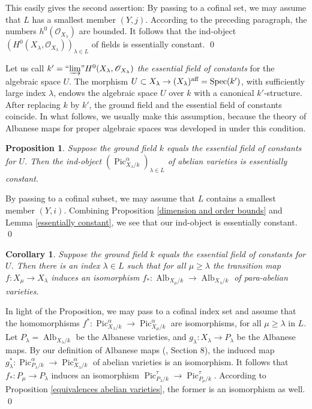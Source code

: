 \documentclass[oneside, 12pt]{amsart}
\newcommand\mylabel[1]{\label{#1}\marginpar{\vspace{-1ex}\medskip\medskip\footnotesize \tt #1}}
\renewcommand\mylabel[1]{\label{#1}}
\newtheorem{proposition}[theorem]{Proposition}
\newtheorem{corollary}[theorem]{Corollary}
\theoremstyle{definition}
\theoremstyle{remark}
\newcommand{\aff}{\text{\rm aff}}
\newcommand{\Alb}{\operatorname{Alb}}
\newcommand{\dirlim}{\varinjlim}
\renewcommand{\O}{\mathscr{O}}
\newcommand{\Pic}{\operatorname{Pic}}
\newcommand{\ra}{\rightarrow}
\newcommand{\Spec}{\operatorname{Spec}}
\begin{document}
This easily gives the second assertion: By passing to a cofinal set, we may assume that $L$ has a smallest member $(Y,j)$.
According to  the preceding paragraph, the numbers $h^0(\O_{X_\lambda})$ are bounded.
It follows that the ind-object  $(H^0(X_\lambda,\O_{X_\lambda}))_{\lambda\in L}$ of fields is essentially constant.
\qed

\medskip
Let us call $k'=``\!\dirlim\!" H^0(X_\lambda,\O_{X_\lambda})$  \emph{the  essential field of constants} for the algebraic space $U$.
The morphism $U\subset X_\lambda\ra (X_\lambda)^\aff=\Spec(k')$, with sufficiently large index  $\lambda$,
endows the algebraic space $U$ over $k$ with a canonical  $k'$-structure.
After replacing  $k$ by $k'$, the ground field and the essential field of constants coincide.
In what follows, we usually make this assumption, because the theory of Albanese maps for proper algebraic spaces
was developed in \cite{Laurent; Schroeer 2021}   under this condition.

\begin{proposition}
\mylabel{pic alpha essentially constant}
Suppose the ground field $k$ equals the essential field of constants for $U$.
Then the  ind-object $(\Pic^\alpha_{X_\lambda/k})_{\lambda\in L}$ of abelian varieties is essentially constant.
\end{proposition} 

\proof
By passing to a cofinal subset, we may assume that $L$ contains a smallest member $(Y,i)$.
Combining Proposition \ref{dimension and order bounds} and Lemma \ref{essentially constant}, we see that our ind-object is essentially constant.
\qed

\begin{corollary}
Suppose the ground field $k$ equals the essential field of constants for $U$.
Then there is an index $\lambda\in L$ such that for all $\mu\geq \lambda$ the transition map  
$f:X_\mu\ra X_\lambda$ induces an isomorphism $f_*:\Alb_{X_\mu/k}\ra \Alb_{X_\lambda/k}$ of para-abelian varieties.
\end{corollary}

\proof
In light of the Proposition, we may pass to  a cofinal index set and  assume that the homomorphisms $f^*:\Pic^\alpha_{X_\lambda/k}\ra \Pic^\alpha_{X_\mu/k}$ are
isomorphisms, for all $\mu\geq \lambda$ in $L$.
Let $P_\lambda=\Alb_{X_\lambda/k}$ be the Albanese varieties, and $g_\lambda:X_\lambda\ra P_\lambda$ be the Albanese maps.
By our definition of Albanese maps (\cite{Laurent; Schroeer 2021}, Section 8), 
the induced map $g_\lambda^*:\Pic^\alpha_{P_\lambda/k}\ra \Pic_{X_\lambda/k}^\alpha$ of abelian varieties
is an isomorphism.
It follows that $f_*:P_\mu\ra P_\lambda$ induces an isomorphism $\Pic^\tau_{P_\lambda/k}\ra \Pic^\tau_{P_\mu/k}$.
According to Proposition \ref{equivalences abelian varieties}, the former is an isomorphism as well.
\qed
\end{document}
